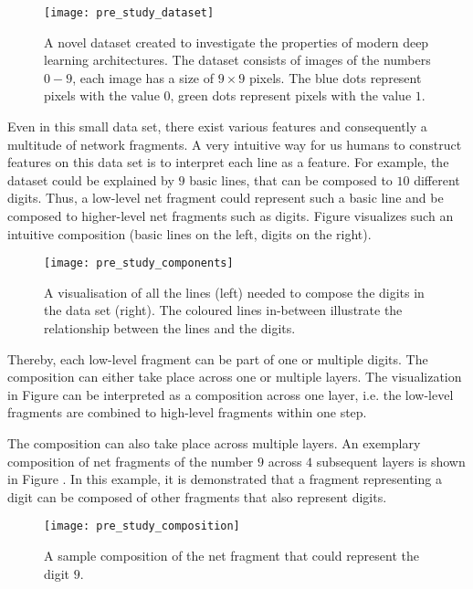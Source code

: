 \begin{figure}[h]
    \centering
    \texttt{[image: pre\_study\_dataset]}
    \caption[Straight Line Digits Dataset]{A novel dataset created to investigate the properties of modern deep learning architectures. The dataset consists of images of the numbers $0-9$, each image has a size of $9\times9$ pixels. The blue dots represent pixels with the value $0$, green dots represent pixels with the value $1$.}
\end{figure}

Even in this small data set, there exist various features and consequently a multitude of network fragments.
A very intuitive way for us humans to construct features on this data set is to interpret each line as a feature.
For example, the dataset could be explained by $9$ basic lines, that can be composed to $10$ different digits.
Thus, a low-level net fragment could represent such a basic line and be composed to higher-level net fragments such as digits.
Figure  visualizes such an intuitive composition (basic lines on the left, digits on the right).

\begin{figure}[h]
    \centering
    \texttt{[image: pre\_study\_components]}
    \caption[Line Types in Straight Line Digits Dataset]{A visualisation of all the lines (left) needed to compose the digits in the data set (right). The coloured lines in-between illustrate the relationship between the lines and the digits.}
\end{figure}

Thereby, each low-level fragment can be part of one or multiple digits.
The composition can either take place across one or multiple layers.
The visualization in Figure  can be interpreted as a composition across one layer, i.e. the low-level fragments are combined to high-level fragments within one step.

The composition can also take place across multiple layers. 
An exemplary composition of net fragments of the number $9$ across $4$ subsequent layers is shown in Figure .
In this example, it is demonstrated that a fragment representing a digit can be composed of other fragments that also represent digits.


\begin{figure}[h]
    \centering
    \texttt{[image: pre\_study\_composition]}
    \caption[Sample Net Fragment Composition]{A sample composition of the net fragment that could represent the digit $9$.}
\end{figure}

